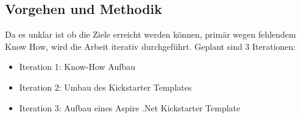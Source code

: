     \subsection{Vorgehen und Methodik}
        Da es unklar ist ob die Ziele erreicht werden können, primär wegen fehlendem Know How, wird die Arbeit iterativ durchgeführt. Geplant sind 3 Iterationen:
        \begin{itemize}
            \item Iteration 1: Know-How Aufbau
            \item Iteration 2: Umbau des Kickstarter Templates
            \item Iteration 3: Aufbau eines Aspire .Net Kickstarter Template
        \end{itemize}
